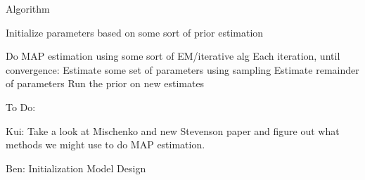 Algorithm

	Initialize parameters based on some sort of prior estimation
	
	Do MAP estimation using some sort of EM/iterative alg
		Each iteration, until convergence:
			Estimate some set of parameters using sampling
			Estimate remainder of parameters
			Run the prior on new estimates
	

To Do:

Kui: Take a look at Mischenko and new Stevenson paper and figure out what methods we might use to do MAP estimation.

Ben: Initialization
         Model Design 
	
		
	
